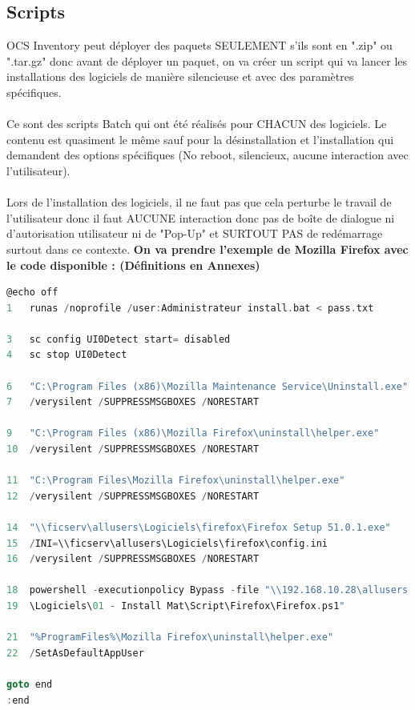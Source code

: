 \documentclass[11pt,a4paper,oneside]{article}
\begin{document}
\subsection{Scripts}

OCS Inventory peut déployer des paquets SEULEMENT s'ils sont en ".zip" ou ".tar.gz" donc avant de déployer un paquet, on va créer un script qui va lancer les installations des logiciels de manière silencieuse et avec des paramètres spécifiques.
\\ \\
Ce sont des scripts Batch qui ont été réalisés pour CHACUN des logiciels. Le contenu est quasiment le même sauf pour la désinstallation et l'installation qui demandent des options spécifiques (No reboot, silencieux, aucune interaction avec l'utilisateur).
\\ \\
Lors de l'installation des logiciels, il ne faut pas que cela perturbe le travail de l'utilisateur donc il faut AUCUNE interaction donc pas de boîte de dialogue ni d'autorisation utilisateur ni de "Pop-Up" et SURTOUT PAS de redémarrage surtout dans ce contexte.
\newpage
\textbf{On va prendre l'exemple de Mozilla Firefox avec le code disponible : (Définitions en Annexes)}
\\
\begin{lstlisting}[language=C]
@echo off
1	runas /noprofile /user:Administrateur install.bat < pass.txt
	
3	sc config UI0Detect start= disabled
4	sc stop UI0Detect

6	"C:\Program Files (x86)\Mozilla Maintenance Service\Uninstall.exe" 
7	/verysilent /SUPPRESSMSGBOXES /NORESTART
	
9	"C:\Program Files (x86)\Mozilla Firefox\uninstall\helper.exe" 
10	/verysilent /SUPPRESSMSGBOXES /NORESTART
	
11	"C:\Program Files\Mozilla Firefox\uninstall\helper.exe" 
12	/verysilent /SUPPRESSMSGBOXES /NORESTART	

14	"\\ficserv\allusers\Logiciels\firefox\Firefox Setup 51.0.1.exe" 
15	/INI=\\ficserv\allusers\Logiciels\firefox\config.ini 
16	/verysilent /SUPPRESSMSGBOXES /NORESTART
	
18	powershell -executionpolicy Bypass -file "\\192.168.10.28\allusers
19	\Logiciels\01 - Install Mat\Script\Firefox\Firefox.ps1"	
	
21	"%ProgramFiles%\Mozilla Firefox\uninstall\helper.exe" 
22	/SetAsDefaultAppUser
	
goto end
:end	
\end{lstlisting}
\end{document}
